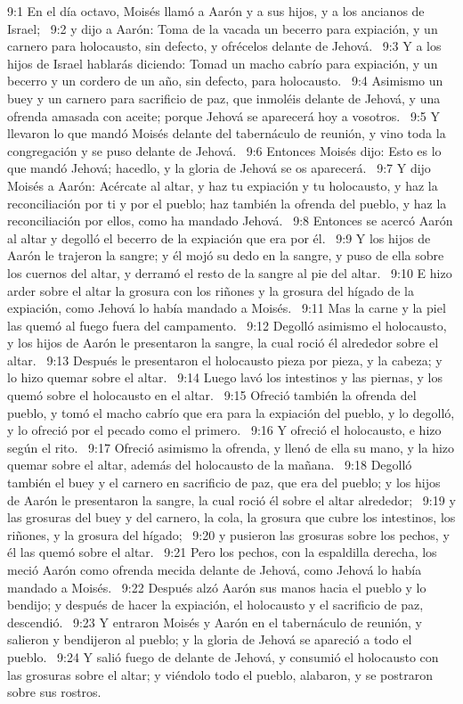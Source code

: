 9:1 En el día octavo, Moisés llamó a Aarón y a sus hijos, y a los ancianos de Israel;  
9:2 y dijo a Aarón: Toma de la vacada un becerro para expiación, y un carnero para holocausto, sin defecto, y ofrécelos delante de Jehová.  
9:3 Y a los hijos de Israel hablarás diciendo: Tomad un macho cabrío para expiación, y un becerro y un cordero de un año, sin defecto, para holocausto.  
9:4 Asimismo un buey y un carnero para sacrificio de paz, que inmoléis delante de Jehová, y una ofrenda amasada con aceite; porque Jehová se aparecerá hoy a vosotros.  
9:5 Y llevaron lo que mandó Moisés delante del tabernáculo de reunión, y vino toda la congregación y se puso delante de Jehová.  
9:6 Entonces Moisés dijo: Esto es lo que mandó Jehová; hacedlo, y la gloria de Jehová se os aparecerá.  
9:7 Y dijo Moisés a Aarón: Acércate al altar, y haz tu expiación y tu holocausto, y haz la reconciliación por ti y por el pueblo; haz también la ofrenda del pueblo, y haz la reconciliación por ellos, como ha mandado Jehová.  
9:8 Entonces se acercó Aarón al altar y degolló el becerro de la expiación que era por él.  
9:9 Y los hijos de Aarón le trajeron la sangre; y él mojó su dedo en la sangre, y puso de ella sobre los cuernos del altar, y derramó el resto de la sangre al pie del altar.  
9:10 E hizo arder sobre el altar la grosura con los riñones y la grosura del hígado de la expiación, como Jehová lo había mandado a Moisés.  
9:11 Mas la carne y la piel las quemó al fuego fuera del campamento.  
9:12 Degolló asimismo el holocausto, y los hijos de Aarón le presentaron la sangre, la cual roció él alrededor sobre el altar.  
9:13 Después le presentaron el holocausto pieza por pieza, y la cabeza; y lo hizo quemar sobre el altar.  
9:14 Luego lavó los intestinos y las piernas, y los quemó sobre el holocausto en el altar.  
9:15 Ofreció también la ofrenda del pueblo, y tomó el macho cabrío que era para la expiación del pueblo, y lo degolló, y lo ofreció por el pecado como el primero.  
9:16 Y ofreció el holocausto, e hizo según el rito.  
9:17 Ofreció asimismo la ofrenda, y llenó de ella su mano, y la hizo quemar sobre el altar, además del holocausto de la mañana.  
9:18 Degolló también el buey y el carnero en sacrificio de paz, que era del pueblo; y los hijos de Aarón le presentaron la sangre, la cual roció él sobre el altar alrededor;  
9:19 y las grosuras del buey y del carnero, la cola, la grosura que cubre los intestinos, los riñones, y la grosura del hígado;  
9:20 y pusieron las grosuras sobre los pechos, y él las quemó sobre el altar.  
9:21 Pero los pechos, con la espaldilla derecha, los meció Aarón como ofrenda mecida delante de Jehová, como Jehová lo había mandado a Moisés.  
9:22 Después alzó Aarón sus manos hacia el pueblo y lo bendijo; y después de hacer la expiación, el holocausto y el sacrificio de paz, descendió.  
9:23 Y entraron Moisés y Aarón en el tabernáculo de reunión, y salieron y bendijeron al pueblo; y la gloria de Jehová se apareció a todo el pueblo.  
9:24 Y salió fuego de delante de Jehová, y consumió el holocausto con las grosuras sobre el altar; y viéndolo todo el pueblo, alabaron, y se postraron sobre sus rostros.  
